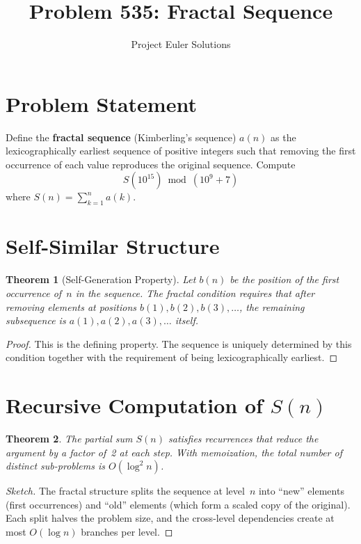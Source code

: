 \documentclass[11pt]{article}
\title{Problem 535: Fractal Sequence}
\author{Project Euler Solutions}
\date{}
\newtheorem{theorem}{Theorem}
\begin{document}
\maketitle

\section{Problem Statement}

Define the \textbf{fractal sequence} (Kimberling's sequence) $a(n)$ as the lexicographically earliest sequence of positive integers such that removing the first occurrence of each value reproduces the original sequence. Compute
\[
S(10^{15}) \bmod (10^9 + 7)
\]
where $S(n) = \sum_{k=1}^{n} a(k)$.

\section{Self-Similar Structure}

\begin{theorem}[Self-Generation Property]
Let $b(n)$ be the position of the first occurrence of~$n$ in the sequence. The fractal condition requires that after removing elements at positions $b(1), b(2), b(3), \ldots$, the remaining subsequence is $a(1), a(2), a(3), \ldots$ itself.
\end{theorem}

\begin{proof}
This is the defining property. The sequence is uniquely determined by this condition together with the requirement of being lexicographically earliest.
\end{proof}

\section{Recursive Computation of $S(n)$}

\begin{theorem}
The partial sum $S(n)$ satisfies recurrences that reduce the argument by a factor of~2 at each step. With memoization, the total number of distinct sub-problems is $O(\log^2 n)$.
\end{theorem}

\begin{proof}[Sketch]
The fractal structure splits the sequence at level~$n$ into ``new'' elements (first occurrences) and ``old'' elements (which form a scaled copy of the original). Each split halves the problem size, and the cross-level dependencies create at most $O(\log n)$ branches per level.
\end{proof}
\end{document}
